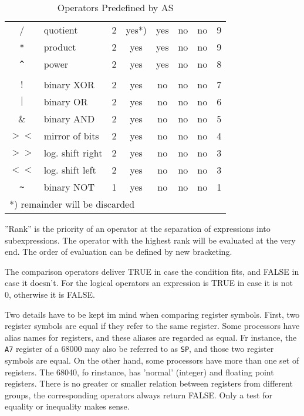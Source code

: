 \documentclass[12pt,twoside]{report}
\newcommand{\asname}{{AS}}
\begin{document}
\begin{table*}[htbp]
\begin{center}
\begin{tabular}{|c|l|c|c|c|c|c|c|}
/           & quotient         & 2 & yes*) & yes & no  & no  & 9 \\
\verb! * !  & product          & 2 & yes   & yes & no  & no  & 9 \\
\verb! ^ !  & power            & 2 & yes   & yes & no  & no  & 8 \\
            & & & & & &  \\
$!$         & binary XOR       & 2 & yes   & no  & no  & no  & 7 \\
$|$         & binary OR        & 2 & yes   & no  & no  & no  & 6 \\
\&          & binary AND       & 2 & yes   & no  & no  & no  & 5 \\
$><$        & mirror of bits   & 2 & yes   & no  & no  & no  & 4 \\
$>>$        & log. shift right & 2 & yes   & no  & no  & no  & 3 \\
$<<$        & log. shift left  & 2 & yes   & no  & no  & no  & 3 \\
\verb! ~ !  & binary NOT       & 1 & yes   & no  & no  & no  & 1 \\
\hline
\multicolumn{8}{|l|}{*) remainder will be discarded} \\
\hline
\end{tabular}\end{center}
\caption{Operators Predefined by \asname{}\label{TabOps}}
\end{table*}
''Rank'' is the priority of an operator at the separation of expressions
into subexpressions.  The operator with the highest rank will be
evaluated at the very end.  The order of evaluation can be defined by
new bracketing.

The comparison operators deliver TRUE in case the condition fits,
and FALSE in case it doesn't.  For the logical operators an expression
is TRUE in case it is not 0, otherwise it is FALSE.

Two details have to be kept im mind when comparing register symbols.
First, two register symbols are equal if they refer to the same 
register.  Some processors have alias names for registers, and these
aliases are regarded as equal.  Fr instance, the {\tt A7} register
of a 68000 may also be referred to as {\tt SP}, and those two register
symbols are equal.  On the other hand, some processors have more than
one set of registers.  The 68040, fo rinstance, has 'normal' (integer)
and floating point registers.  There is no greater or smaller relation
between registers from different groups, the corresponding operators
always return FALSE.  Only a test for equality or inequality makes
sense.
\end{document}
